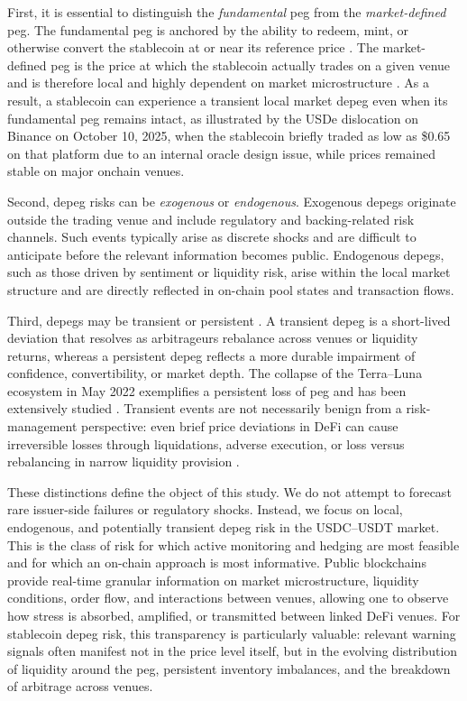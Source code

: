 \documentclass[a4paper,fleqn]{cas-sc}
\begin{document}
First, it is essential to distinguish the \emph{fundamental} peg from the \emph{market-defined} peg. The fundamental peg is anchored by the ability to redeem, mint, or otherwise convert the stablecoin at or near its reference price \citep{Lyons2023}. The market-defined peg is the price at which the stablecoin actually trades on a given venue and is therefore local and highly dependent on market microstructure \citep{MAKAROV2020} . As a result, a stablecoin can experience a transient local market depeg even when its fundamental peg remains intact, as illustrated by the USDe dislocation on Binance on October 10, 2025, when the stablecoin briefly traded as low as \$0.65 on that platform due to an internal oracle design issue, while prices remained stable on major onchain venues.

Second, depeg risks can be \emph{exogenous} or \emph{endogenous}. Exogenous depegs originate outside the trading venue and include regulatory and backing-related risk channels. Such events typically arise as discrete shocks and are difficult to anticipate before the relevant information becomes public. Endogenous depegs, such as those driven by sentiment or liquidity risk, arise within the local market structure and are directly reflected in on-chain pool states and transaction flows.

Third, depegs may be transient or persistent \citep{DUAN2023}. A transient depeg is a short-lived deviation that resolves as arbitrageurs rebalance across venues or liquidity returns, whereas a persistent depeg reflects a more durable impairment of confidence, convertibility, or market depth. The collapse of the Terra–Luna ecosystem in May 2022 exemplifies a persistent loss of peg and has been extensively studied \citep{BRIOLA2023}. Transient events are not necessarily benign from a risk-management perspective: even brief price deviations in DeFi can cause irreversible losses through liquidations, adverse execution, or loss versus rebalancing in narrow liquidity provision \citep{QIN2021}.

These distinctions define the object of this study. We do not attempt to forecast rare issuer-side failures or regulatory shocks. Instead, we focus on local, endogenous, and potentially transient depeg risk in the USDC--USDT market. This is the class of risk for which active monitoring and hedging are most feasible and for which an on-chain approach is most informative. Public blockchains provide real-time granular information on market microstructure, liquidity conditions, order flow, and interactions between venues, allowing one to observe how stress is absorbed, amplified, or transmitted between linked DeFi venues. For stablecoin depeg risk, this transparency is particularly valuable: relevant warning signals often manifest not in the price level itself, but in the evolving distribution of liquidity around the peg, persistent inventory imbalances, and the breakdown of arbitrage across venues.
\end{document}
